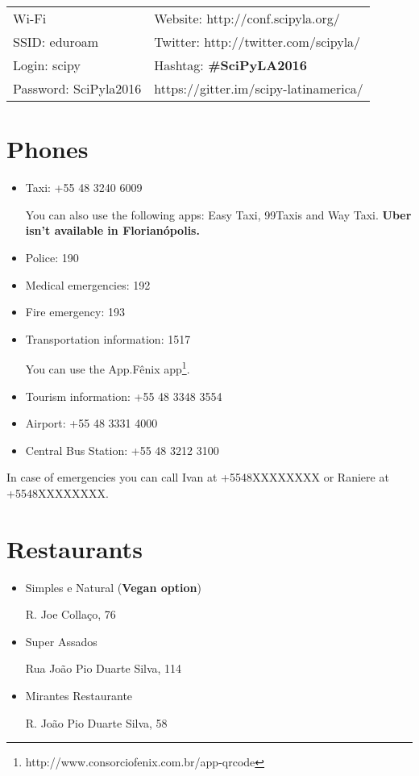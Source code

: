 \documentclass[10pt]{article}
\begin{document}
\begin{center}
  \begin{tabular}{p{3.5cm} p{7cm}}
     Wi-Fi & Website: http://conf.scipyla.org/ \\
     SSID: eduroam & Twitter: http://twitter.com/scipyla/ \\
     Login: scipy & Hashtag: \textbf{\#SciPyLA2016} \\
     Password: SciPyla2016 & https://gitter.im/scipy-latinamerica/
   \end{tabular}
\end{center}

\section*{Phones}

\begin{itemize}
    \item Taxi: +55 48 3240 6009

      You can also use the following apps: Easy Taxi, 99Taxis and Way Taxi.
      \textbf{Uber isn't available in Florianópolis.}
    \item Police: 190
    \item Medical emergencies: 192
    \item Fire emergency: 193
    \item Transportation information: 1517

      You can use the App.Fênix app\footnote{http://www.consorciofenix.com.br/app-qrcode}.
    \item Tourism information: +55 48 3348 3554
    \item Airport: +55 48 3331 4000
    \item Central Bus Station: +55 48 3212 3100
\end{itemize}

In case of emergencies you can call Ivan at +5548XXXXXXXX or Raniere at +5548XXXXXXXX.

\clearpage

\section*{Restaurants}

\begin{itemize}
  \item Simples e Natural (\textbf{Vegan option})

    R. Joe Collaço, 76
  \item Super Assados

    Rua João Pio Duarte Silva, 114

  \item Mirantes Restaurante

    R. João Pio Duarte Silva, 58
\end{itemize}
\end{document}
